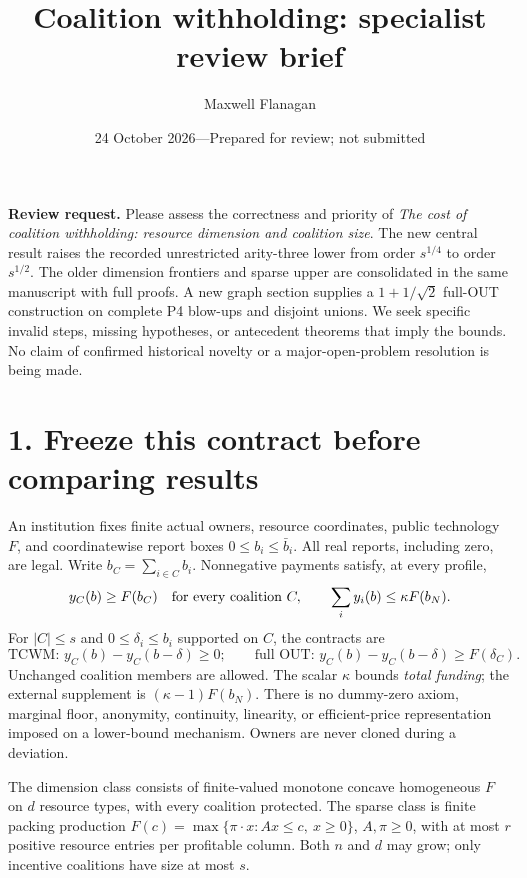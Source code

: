 \documentclass[11pt]{article}
\title{Coalition withholding: specialist review brief}
\author{Maxwell Flanagan}
\date{24 October 2026\quad---\quad Prepared for review; not submitted}
\begin{document}
\maketitle
\noindent\textbf{Review request.} Please assess the correctness and priority of
\emph{The cost of coalition withholding: resource dimension and coalition size}.
The new central result raises the recorded unrestricted arity-three lower from
order $s^{1/4}$ to order $s^{1/2}$. The older dimension frontiers and sparse
upper are consolidated in the same manuscript with full proofs. A new graph
section supplies a $1+1/\sqrt2$ full-OUT construction on complete P4 blow-ups
and disjoint unions. We seek
specific invalid steps, missing hypotheses, or antecedent theorems that imply
the bounds. No claim of confirmed historical novelty or a major-open-problem
resolution is being made.

\section*{1. Freeze this contract before comparing results}
An institution fixes finite actual owners, resource coordinates, public
technology $F$, and coordinatewise report boxes $0\le b_i\le\bar b_i$.
All real reports, including zero, are legal. Write $b_C=\sum_{i\in C}b_i$.
Nonnegative payments satisfy, at every profile,
\[
 y_C(b)\ge F(b_C)\quad\hbox{for every coalition }C,
 \qquad \sum_i y_i(b)\le\kappa F(b_N).
\]
For $|C|\le s$ and $0\le\delta_i\le b_i$ supported on $C$, the contracts are
\[
 \text{TCWM: } y_C(b)-y_C(b-\delta)\ge0;
 \qquad
 \text{full OUT: } y_C(b)-y_C(b-\delta)\ge F(\delta_C).
\]
Unchanged coalition members are allowed. The scalar $\kappa$ bounds
\emph{total funding}; the external supplement is $(\kappa-1)F(b_N)$.
There is no dummy-zero axiom, marginal floor, anonymity, continuity, linearity,
or efficient-price representation imposed on a lower-bound mechanism.
Owners are never cloned during a deviation.

The dimension class consists of finite-valued monotone concave homogeneous
$F$ on $d$ resource types, with every coalition protected. The sparse class is
finite packing production $F(c)=\max\{\pi\cdot x:Ax\le c,\ x\ge0\}$,
$A,\pi\ge0$, with at most $r$ positive resource entries per profitable column.
Both $n$ and $d$ may grow; only incentive coalitions have size at most $s$.
\end{document}
